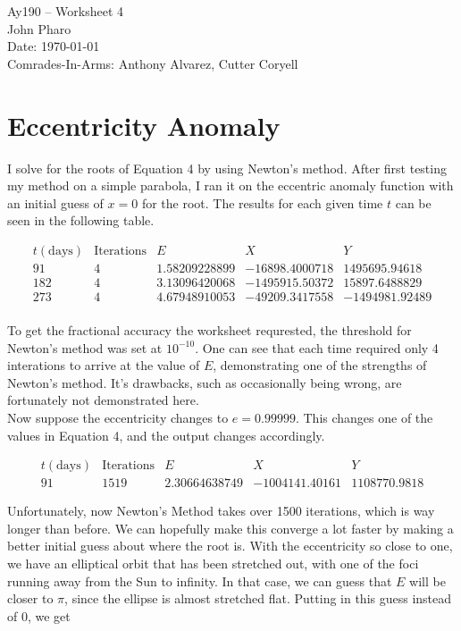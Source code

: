 \documentclass[11pt,letterpaper]{article}
\begin{document}
\begin{center}
\Large
Ay190 -- Worksheet 4\\
John Pharo\\
Date: \today \\
Comrades-In-Arms: Anthony Alvarez, Cutter Coryell
\end{center}

\section*{Eccentricity Anomaly}

I solve for the roots of Equation 4 by using Newton's method. After first testing my method on a simple parabola, I ran it on the eccentric anomaly function with an initial guess of $x=0$ for the root. The results for each given time $t$ can be seen in the following table.

\[
\begin{array}{ccccc}
t(\text{days}) & \text{Iterations} & E & X & Y \\
91 & 4 & 1.58209228899 & -16898.4000718 & 1495695.94618 \\
182 & 4 & 3.13096420068 & -1495915.50372 & 15897.6488829 \\
273 & 4 & 4.67948910053 & -49209.3417558 & -1494981.92489 \\
\end{array}
\]

To get the fractional accuracy the worksheet requrested, the threshold for Newton's method was set at $10^{-10}$. One can see that each time required only 4 interations to arrive at the value of $E$, demonstrating one of the strengths of Newton's method. It's drawbacks, such as occasionally being wrong, are fortunately not demonstrated here. \\

Now suppose the eccentricity changes to $e=0.99999$. This changes one of the values in Equation 4, and the output changes accordingly.

\[
\begin{array}{ccccc}
t(\text{days}) & \text{Iterations} & E & X & Y \\
91 & 1519 & 2.30664638749 & -1004141.40161 & 1108770.9818
\end{array}
\]

Unfortunately, now Newton's Method takes over 1500 iterations, which is way longer than before. We can hopefully make this converge a lot faster by making a better initial guess about where the root is. With the eccentricity so close to one, we have an elliptical orbit that has been stretched out, with one of the foci running away from the Sun to infinity. In that case, we can guess that $E$ will be closer to $\pi$, since the ellipse is almost stretched flat. Putting in this guess instead of 0, we get
\end{document}
